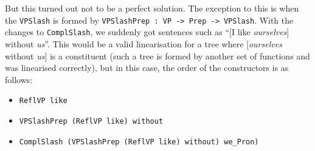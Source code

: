 But this turned out not to be a perfect solution. The exception to this
is when the \texttt{VPSlash} is formed by
\texttt{VPSlashPrep : VP -\textgreater{} Prep -\textgreater{} VPSlash}.
With the changes to \texttt{ComplSlash}, we suddenly got sentences such
as ``{[}I like \emph{ourselves}{]} without \emph{us}''. This would be a
valid linearisation for a tree where {[}\emph{ourselves} without
\emph{us}{]} is a constituent (such a tree is formed by another set of
functions and was linearised correctly), but in this case, the order of
the constructors is as follows:

\begin{itemize}
\item
  \texttt{ReflVP like}

\begin{EmptyItem}
\begin{Highlighting}[]
    \FunctionTok{=}  \NormalTok{;}
\FunctionTok{=}  \OtherTok{=>}  \NormalTok{; } \OtherTok{=>}  
\end{Highlighting}
\end{EmptyItem}
\item
  \texttt{VPSlashPrep (ReflVP like) without}

\begin{EmptyItem}
\begin{Highlighting}[]
    \FunctionTok{=}  \NormalTok{;}
\FunctionTok{=}  \OtherTok{=>}  \NormalTok{; } \OtherTok{=>}  
 \FunctionTok{=} 
\end{Highlighting}
\end{EmptyItem}
\item
  \texttt{ComplSlash (VPSlashPrep (ReflVP like) without) we\_Pron)}

\begin{EmptyItem}
\begin{Highlighting}[]
    \FunctionTok{=}  \NormalTok{;}
\FunctionTok{=}  \OtherTok{=>}  \NormalTok{; } \OtherTok{=>}  
  \FunctionTok{=} 
\end{Highlighting}
\end{EmptyItem}


\end{itemize}
